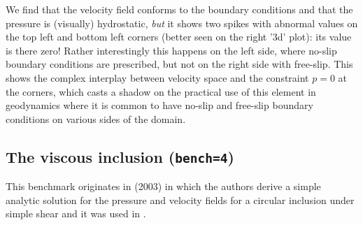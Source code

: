 We find that the velocity field conforms to the boundary conditions and that 
the pressure is (visually) hydrostatic, {\it but} it shows two spikes with abnormal 
values on the top left and bottom left corners (better seen on the right '3d' plot): 
its value is there zero! Rather 
interestingly this happens on the left side, where no-slip boundary 
conditions are prescribed, but not on the right side with free-slip.
This shows the complex interplay between velocity space and the 
constraint $p=0$ at the corners, which casts a shadow on the practical use of this element
in geodynamics where it is common to have no-slip and free-slip boundary conditions on
various sides of the domain.

\subsection*{The viscous inclusion ({\tt bench=4})}

This benchmark originates in \textcite{scpo03} (2003) in which the 
authors derive a simple analytic solution for the pressure and 
velocity fields for a circular 
inclusion under simple shear and it was used 
in \cite{deka08,sunh10,dumg11,krhb12,gemd13}.


